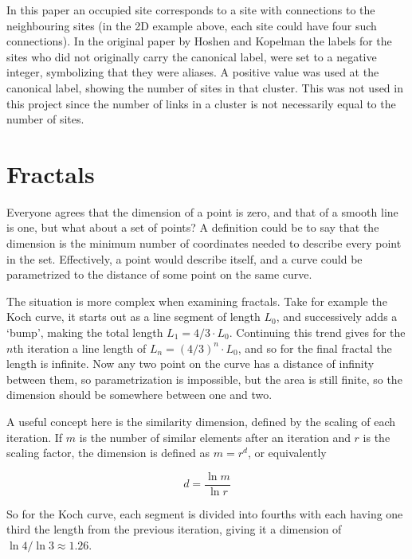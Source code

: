 In this paper an occupied site corresponds to a site with connections to the neighbouring sites (in the 2D example above, each site could have four such connections). In the original paper by Hoshen and Kopelman the labels for the sites who did not originally carry the canonical label, were set to a negative integer, symbolizing that they were aliases. A positive value was used at the canonical label, showing the number of sites in that cluster. This was not used in this project since the number of links in a cluster is not necessarily equal to the number of sites.

\section{Fractals}
\label{sec:fractals}

Everyone agrees that the dimension of a point is zero, and that of a smooth line is one, but what about a set of points? A definition could be to say that the dimension is the minimum number of coordinates needed to describe every point in the set. Effectively, a point would describe itself, and a curve could be parametrized to the distance of some point on the same curve.

The situation is more complex when examining fractals. Take for example the Koch curve, it starts out as a line segment of length $L_0$, and successively adds a `bump', making the total length $L_1 = 4/3 \cdot L_0$. Continuing this trend gives for the $n$th iteration a line length of $L_n = {(4 / 3)}^n \cdot L_0$, and so for the final fractal the length is infinite. Now any two point on the curve has a distance of infinity between them, so parametrization is impossible, but the area is still finite, so the dimension should be somewhere between one and two.

A useful concept here is the similarity dimension, defined by the scaling of each iteration. If $m$ is the number of similar elements after an iteration and $r$ is the scaling factor, the dimension is defined as $m = r^d$, or equivalently

\begin{equation}
	d = \frac{\ln m}{\ln r}
\end{equation}

So for the Koch curve, each segment is divided into fourths with each having one third the length from the previous iteration, giving it a dimension of $\ln 4 / \ln 3 \approx 1.26$.



